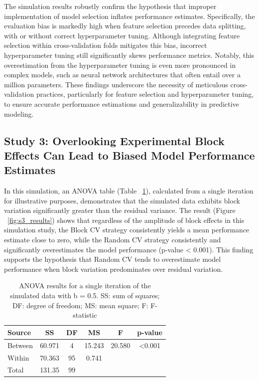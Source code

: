 The simulation results robustly confirm the hypothesis that improper implementation of model selection inflates performance estimates. Specifically, the evaluation bias is markedly high when feature selection precedes data splitting, with or without correct hyperparameter tuning. Although integrating feature selection within cross-validation folds mitigates this bias, incorrect hyperparameter tuning still significantly skews performance metrics. Notably, this overestimation from the hyperparameter tuning is even more pronounced in complex models, such as neural network architectures that often entail over a million parameters. These findings underscore the necessity of meticulous cross-validation practices, particularly for feature selection and hyperparameter tuning, to ensure accurate performance estimations and generalizability in predictive modeling.

\subsection{Study 3: Overlooking Experimental Block Effects Can Lead to Biased Model Performance Estimates}

In this simulation, an ANOVA table (Table ~\ref{tab:anova}), calculated from a single iteration for illustrative purposes, demonstrates that the simulated data exhibits block variation significantly greater than the residual variance. The result (Figure ~\ref{fig:s3_results}) shows that regardless of the amplitude of block effects in this simulation study, the Block CV strategy consistently yields a mean performance estimate close to zero, while the Random CV strategy consistently and significantly overestimates the model performance (p-value < 0.001). This finding supports the hypothesis that Random CV tends to overestimate model performance when block variation predominates over residual variation.

\begin{table}
    \caption{ANOVA results for a single iteration of the simulated data with b = 0.5. SS: sum of squares; DF: degree of freedom; MS: mean square; F: F-statistic}
    \centering
    \begin{tabular}{lccccc}
        \toprule
        Source & SS & DF & MS & F & p-value \\
        \midrule
        Between & 60.971 & 4 & 15.243 & 20.580 & <0.001 \\
        Within & 70.363 & 95 & 0.741 & &  \\
        \cmidrule(r){1-3}
        Total & 131.35 & 99 & & & \\
        \bottomrule
    \end{tabular}
    \label{tab:anova}
\end{table}

